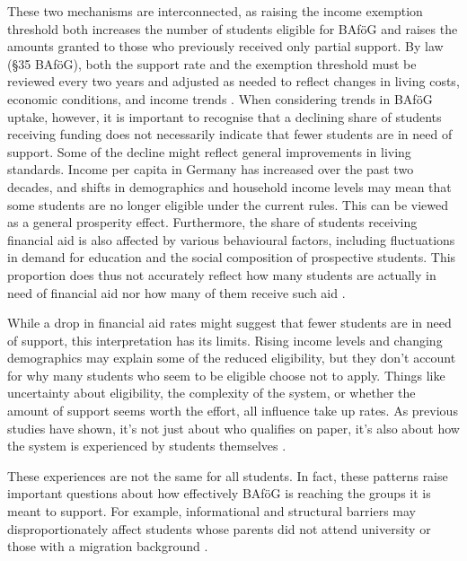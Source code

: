 These two mechanisms are interconnected, as raising the income exemption threshold both increases the number of students eligible for BAföG and raises the amounts granted to those who previously received only partial support. By law (§35 BAföG), both the support rate and the exemption threshold must be reviewed every two years and adjusted as needed to reflect changes in living costs, economic conditions, and income trends \citep{bafoeg_law, meier_zur_2024}.
When considering trends in BAföG uptake, however, it is important to recognise that a declining share of students receiving funding does not necessarily indicate that fewer students are in need of support. Some of the decline might reflect general improvements in living standards. Income per capita in Germany has increased over the past two decades, and shifts in demographics and household income levels may mean that some students are no longer eligible under the current rules. This can be viewed as a general prosperity effect. Furthermore, the share of students receiving financial aid is also affected by various behavioural factors, including fluctuations in demand for education and the social composition of prospective students. This proportion does thus not accurately reflect how many students are actually in need of financial aid nor how many of them receive such aid \citep{meier_bafog_2024, meier_zur_2024}.

While a drop in financial aid rates might suggest that fewer students are in need of support, this interpretation has its limits. Rising income levels and changing demographics may explain some of the reduced eligibility, but they don't account for why many students who seem to be eligible choose not to apply. Things like uncertainty about eligibility, the complexity of the system, or whether the amount of support seems worth the effort, all influence take up rates. As previous studies have shown, it’s not just about who qualifies on paper, it’s also about how the system is experienced by students themselves \citep{meier_bafog_2024, meier_zur_2024}.

​​These experiences are not the same for all students. In fact, these patterns raise important questions about how effectively BAföG is reaching the groups it is meant to support. For example, informational and structural barriers may disproportionately affect students whose parents did not attend university or those with a migration background \citep{kroher_studierendenbefragung_2023}.

